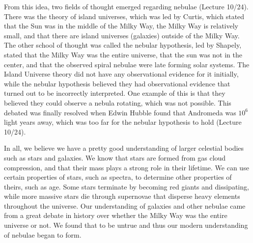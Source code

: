 \documentclass[12pt]{article}
\begin{document}
From this idea, two fields of thought emerged regarding nebulae (Lecture 10/24).
There was the
theory of island universes, which was led by Curtis, which stated that the Sun
was in the middle of the Milky Way, the Milky Way is relatively small, and that
there are island universes (galaxies) outside of the Milky Way.  The other
school of thought was called the nebular hypothesis, led by Shapely, stated that
the Milky Way was the entire
universe, that the sun was not in the center, and that the observed spiral
nebulae were late forming solar systems.  The Island Universe theory did not
have any observational evidence for it initially, while the nebular hypothesis
believed they had observational evidence that turned out to be incorrectly
interpreted. One example of this is that they believed they could observe a
nebula rotating, which was not possible.  This debated was finally resolved when
Edwin Hubble found that Andromeda was $10^6$ light years away, which was too far
for the nebular hypothesis to hold (Lecture 10/24).

In all, we believe we have a pretty good understanding of larger celestial
bodies such as stars and galaxies.  We know that stars are formed from gas cloud
compression, and that their mass plays a strong role in their lifetime.  We can
use certain properties of stars, such as spectra, to determine other properties
of theirs, such as age.  Some stars terminate by becoming red giants and
dissipating, while more massive stars die through supernovae that disperse heavy
elements throughout the universe.  Our understanding of galaxies and other
nebulae came from a great debate in history over whether the Milky Way was the
entire universe or not.  We found that to be untrue and thus our modern
understanding of nebulae began to form.
\end{document}
